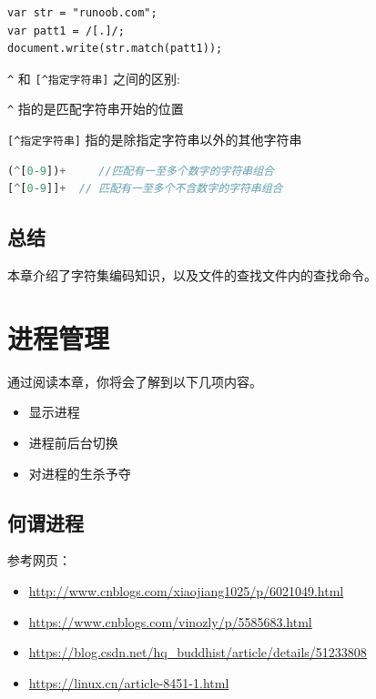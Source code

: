 \documentclass[doctor,openright,twoside]{sjtuthesis}
\providecommand{\tightlist}{%
    \setlength{\itemsep}{0pt}\setlength{\parskip}{0pt}}
\newcommand{\passthrough}[1]{#1}
\theoremstyle{plain}
\theoremstyle{definition}
\theoremstyle{remark}
\theoremstyle{ocrenumbox}
\theoremstyle{plain}
\begin{document}
\begin{lstlisting}
var str = "runoob.com";
var patt1 = /[.]/;
document.write(str.match(patt1));
\end{lstlisting}

\passthrough{\lstinline!^!} 和 \passthrough{\lstinline![^指定字符串]!}
之间的区别:

\passthrough{\lstinline!^!} 指的是匹配字符串开始的位置

\passthrough{\lstinline![^指定字符串]!}
指的是除指定字符串以外的其他字符串

\begin{lstlisting}[language=PHP]
(^[0-9])+     //匹配有一至多个数字的字符串组合
[^[0-9]]+  // 匹配有一至多个不含数字的字符串组合
\end{lstlisting}

\hypertarget{-5}{%
\section{总结}\label{-5}}

本章介绍了字符集编码知识，以及文件的查找文件内的查找命令。

\hypertarget{chap:manager-process}{%
\chapter{进程管理}\label{chap:manager-process}}

通过阅读本章，你将会了解到以下几项内容。

\begin{itemize}
\tightlist
\item
  显示进程
\item
  进程前后台切换
\item
  对进程的生杀予夺
\end{itemize}

\section{何谓进程}

参考网页：

\begin{itemize}
\tightlist
\item
  \url{http://www.cnblogs.com/xiaojiang1025/p/6021049.html}
\item
  \url{https://www.cnblogs.com/vinozly/p/5585683.html}
\item
  \url{https://blog.csdn.net/hq_buddhist/article/details/51233808}
\item
  \url{https://linux.cn/article-8451-1.html}
\end{itemize}
\end{document}
